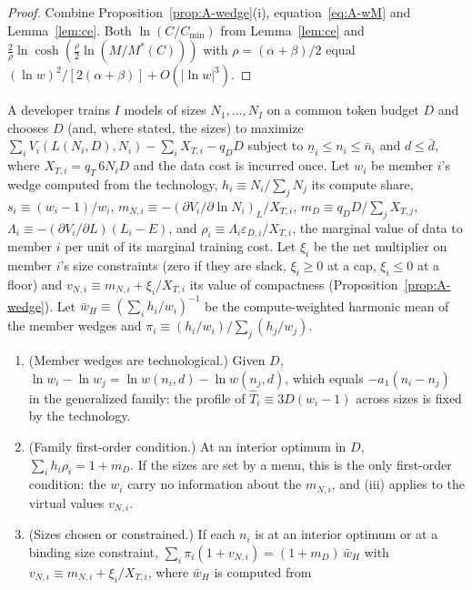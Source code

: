 \begin{proof}
Combine Proposition~\ref{prop:A-wedge}(i), equation~\eqref{eq:A-wM} and Lemma~\ref{lem:ce}. Both
$\ln(C/C_{\min})$ from Lemma~\ref{lem:ce} and $\tfrac{2}{\rho}\ln\cosh(\tfrac\rho2\ln(M/M^*(C)))$ with
$\rho=(\alpha+\beta)/2$ equal $(\ln w)^2/[2(\alpha+\beta)]+O(|\ln w|^3)$.
\end{proof}

\begin{proposition}\label{prop:A-family}
A developer trains $I$ models of sizes $N_1,\dots,N_I$ on a common token budget $D$ and chooses $D$ (and, where stated,
the sizes) to maximize $\sum_iV_i(L(N_i,D),N_i)-\sum_iX_{T,i}-q_DD$ subject to $\underline n_i\le n_i\le\bar n_i$ and
$d\le\bar d$, where $X_{T,i}=q_T\,6N_iD$ and the data cost is incurred once. Let $w_i$ be member $i$'s wedge computed from
the technology, $h_i\equiv N_i/\sum_jN_j$ its compute share, $s_i\equiv(w_i-1)/w_i$,
$m_{N,i}\equiv-(\partial V_i/\partial\ln N_i)_L/X_{T,i}$, $m_D\equiv q_DD/\sum_jX_{T,j}$,
$\Lambda_i\equiv-(\partial V_i/\partial L)(L_i-E)$, and $\rho_i\equiv\Lambda_i\varepsilon_{D,i}/X_{T,i}$, the marginal
value of data to member $i$ per unit of its marginal training cost. Let $\xi_i$ be the net multiplier on member $i$'s size
constraints (zero if they are slack, $\xi_i\ge0$ at a cap, $\xi_i\le0$ at a floor) and $v_{N,i}\equiv m_{N,i}+\xi_i/X_{T,i}$
its value of compactness (Proposition~\ref{prop:A-wedge}). Let $\bar w_H\equiv(\sum_ih_i/w_i)^{-1}$ be the
compute-weighted harmonic mean of the member wedges and $\pi_i\equiv(h_i/w_i)/\sum_j(h_j/w_j)$.
\begin{enumerate}
\item[(i)] (Member wedges are technological.) Given $D$, $\ln w_i-\ln w_j=\ln w(n_i,d)-\ln w(n_j,d)$, which equals
$-a_1(n_i-n_j)$ in the generalized family: the profile of $\hat T_i\equiv3D(w_i-1)$ across sizes is fixed by the technology.
\item[(ii)] (Family first-order condition.) At an interior optimum in $D$, $\sum_ih_i\rho_i=1+m_D$. If the sizes are
set by a menu, this is the only first-order condition: the $w_i$ carry no information about the $m_{N,i}$, and (iii)
applies to the virtual values $v_{N,i}$.
\item[(iii)] (Sizes chosen or constrained.) If each $n_i$ is at an interior optimum or at a binding size constraint,
$\sum_i\pi_i(1+v_{N,i})=(1+m_D)\,\bar w_H$ with $v_{N,i}\equiv m_{N,i}+\xi_i/X_{T,i}$, where $\bar w_H$ is computed from

\end{enumerate}
\end{proposition}
